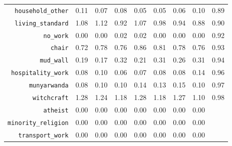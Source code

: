 \begin{longtable}{rrrrrrrrr}
  {\texttt{household\_other}} & 0.11 & 0.07 & 0.08 & 0.05 & 0.05 & 0.06 & 0.10 & 0.89 \\ 
  {\texttt{living\_standard}} & 1.08 & 1.12 & 0.92 & 1.07 & 0.98 & 0.94 & 0.88 & 0.90 \\ 
  {\texttt{no\_work}} & 0.00 & 0.00 & 0.02 & 0.02 & 0.00 & 0.00 & 0.00 & 0.92 \\ 
  {\texttt{chair}} & 0.72 & 0.78 & 0.76 & 0.86 & 0.81 & 0.78 & 0.76 & 0.93 \\ 
  {\texttt{mud\_wall}} & 0.19 & 0.17 & 0.32 & 0.21 & 0.31 & 0.26 & 0.31 & 0.94 \\ 
  {\texttt{hospitality\_work}} & 0.08 & 0.10 & 0.06 & 0.07 & 0.08 & 0.08 & 0.14 & 0.96 \\ 
  {\texttt{munyarwanda}} & 0.08 & 0.10 & 0.10 & 0.14 & 0.13 & 0.15 & 0.10 & 0.97 \\ 
  {\texttt{witchcraft}} & 1.28 & 1.24 & 1.18 & 1.28 & 1.18 & 1.27 & 1.10 & 0.98 \\ 
  {\texttt{atheist}} & 0.00 & 0.00 & 0.00 & 0.00 & 0.00 & 0.00 & 0.00 &  \\ 
  {\texttt{minority\_religion}} & 0.00 & 0.00 & 0.00 & 0.00 & 0.00 & 0.00 & 0.00 &  \\ 
  {\texttt{transport\_work}} & 0.00 & 0.00 & 0.00 & 0.00 & 0.00 & 0.00 & 0.00 &  \\ 
   \hline
\hline
\end{longtable}
